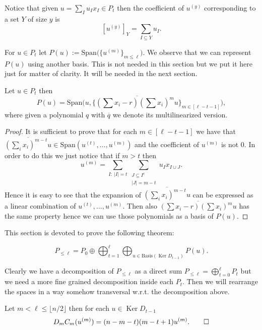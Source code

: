 \documentclass[a4paper,twoside,justified]{tufte-handout}
\DeclareMathOperator{\Ker}{Ker}
\begin{document}
Notice that given $u=\sum_{I}u_Ix_I\in P_t$ then the coefficient of $u^{(y)}$ corresponding to a set $Y$ of size $y$ is
$$
[u^{(y)}]_Y=\sum_{I \subseteq Y}u_I.
$$

For $u\in P_t$ let $P(u):=\mathrm{Span}\Big(\big\{u^{(m)}\big\}_{m \leq \ell}\Big)$.
We observe that we can represent $P(u)$ using another basis. This is not needed in this section but we put it here just for matter of clarity. It will be needed in the next section.

\begin{proposition} \label{prop:basis}
Let $u\in P_t$ then 
\begin{equation*} 
P(u)=\mathrm{Span}\Big(u,\Big\{\overline{(\sum x_i -r)(\sum x_i)^mu}\Big\}_{m\in [\ell-t-1]}\Big),
\end{equation*}
where given a polynomial $q$ with $\overline q$ we denote its multilinearized version.
\end{proposition}
\begin{proof}
It is sufficient to prove that for each $m\in [\ell -t -1]$ we have that $\overline{(\sum_i x_i)^{m-t}u}\in \mathrm{Span}(u^{(t)},\ldots, u^{(m)})$ and the coefficient of $u^{(m)}$ is not $0$. In order to do this we just notice that if $m>t$ then 
$$
u^{(m)}=\sum_{I:\ |I|=t} \sum_{\substack{J \subseteq I^c\\ |J|=m-t}} u_I x_{I \cup J}.
$$
Hence it is easy to see that the expansion of $\overline{(\sum_i x_i)^{m-t}u}$ can be expressed as a linear combination of $u^{(t)},\ldots, u^{(m)}$. Then also $\overline{(\sum x_i -r)(\sum x_i)^mu}$ has the same property hence we can use those polynomials as a basis of $P(u)$.
\end{proof}

This section is devoted to prove the following theorem:
\begin{theorem}\label{thm:decomposition}
\begin{equation}
P_{\leq \ell}=P_0\oplus \bigoplus_{t=1}^{\ell}\bigoplus_{u \in \mathrm{Basis}(\Ker D_{t-1})}P(u).
\end{equation}
\end{theorem}

Clearly we have a decomposition of $P_{\leq \ell}$ as a direct sum $P_{\leq \ell}=\bigoplus_{t=0}^\ell P_t$ but we need a more fine grained decomposition inside each $P_t$. Then we will rearrange the spaces in a way somehow transversal w.r.t. the decomposition above. 

\begin{lemma}\label{lem:identity}
Let $m <\ell \leq \lfloor n/2\rfloor$ then for each $u\in \Ker D_{t-1}$
\begin{equation*}
D_mC_m(u^{(m)})=(n-m-t)(m-t+1)u^{(m)}.\qed
\end{equation*}
\end{lemma}
\end{document}
